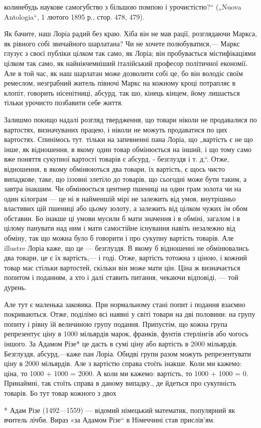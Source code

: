 \parcont{}  %
колинебудь наукове самогубство з більшою помпою і урочистістю?“  („Nuova Antologia“, 1 лютого
1895 р., стор. 478, 479).

Як бачите, наш Лоріа радий без краю. Хіба він не мав рації, розглядаючи
Маркса, як рівного собі звичайного шарлатана?  Чи не хочете полюбуватися,— Маркс глузує з своєї
публіки цілком так само, як Лоріа; він пробувається містифікаціями цілком так само, як
найнікчемніший італійський професор політичної економії. Але в той час, як наш шарлатан може
дозволити собі це, бо він володіє своїм ремеслом, незграбний житель півночі Маркс на кожному
кроці потрапляє в клопіт, говорить нісенітниці, абсурд, так шо, кінець кінцем, йому лишається
тільки урочисто позбавити себе життя.

Залишмо покищо надалі розгляд твердження, що товари ніколи
не продавалися по вартостях, визначуваних працею, і ніколи не можуть продаватися по цих
вартостях. Спинімось тут. тільки на запевненні пана Лоріа, що „вартість є не що інше, як
відношення, в якому один товар обмінюється на інший, і що тому само вже поняття сукупної вартості
товарів є абсурд, - безглуздя і т. д.“. Отже, відношення, в якому обмінюються два товари, їх
вартість, є щось чисто випадкове, таке, що іззовні злетіло до товарів, що сьогодні може бути
таким, а завтра інакшим. Чи обмінюється центнер пшениці на один грам золота чи на один кілограм —
це ні в найменшій мірі не залежить від умов, внутрішньо властивих цій пшениці або цьому золоту,
а залежить від цілком чужих їм обом обставин. Бо інакше ці умови мусили б мати значення і в
обміні, загалом і в цілому панувати над ним і мати самостійне існування навіть незалежно від
обміну, так що можна було б говорити і про сукупну вартість товарів. Але illustre Лоріа каже, що
це — безглуздя. В якому б відношенні не обмінювались два товари, це є їх вартість,— і годі.
Отже, вартість тотожна з ціною, і кожний товар має стільки вартостей, скільки він може мати цін.
Ціна ж визначається попитом і поданням, а хто і далі ставить питання, чекаючи відповіді, — той
дурень.

Але тут є маленька заковика. При нормальному стані попит і подання взаємно покриваються.
Отже, поділімо всі наявні у світі товари на дві половини: на групу попиту і рівну їй величиною
групу подання. Припустім, що кожна група репрезентує ціну в 1000 мільярдів марок, франків,
фунтів стерлінгів або чогось іншого. За Адамом Різе* це дасть в сумі ціну або вартість в 2000
мільярдів. Безглуздя, абсурд,—каже пан Лоріа. Обидві групи разом можуть репрезентувати ціну в
2000 мільярдів. Але з вартістю справа стоїть інакше. Коли ми кажемо:  ціна, то 1000 + 1000 =
2000. А коли ми кажемо: вартість, то 1000 + 1000 = 0. Принаймні, так стоїть справа в даному
випадку., де йдеться про сукупність товарів. Бо тут товар кожного з двох

* Адам Різе (1492—1559) — відомий німецький математик, популярний як вчитель лічби. Вираз «за Адамом Різе“ в Німеччині став прислів’ям. 
\parbreak{}
